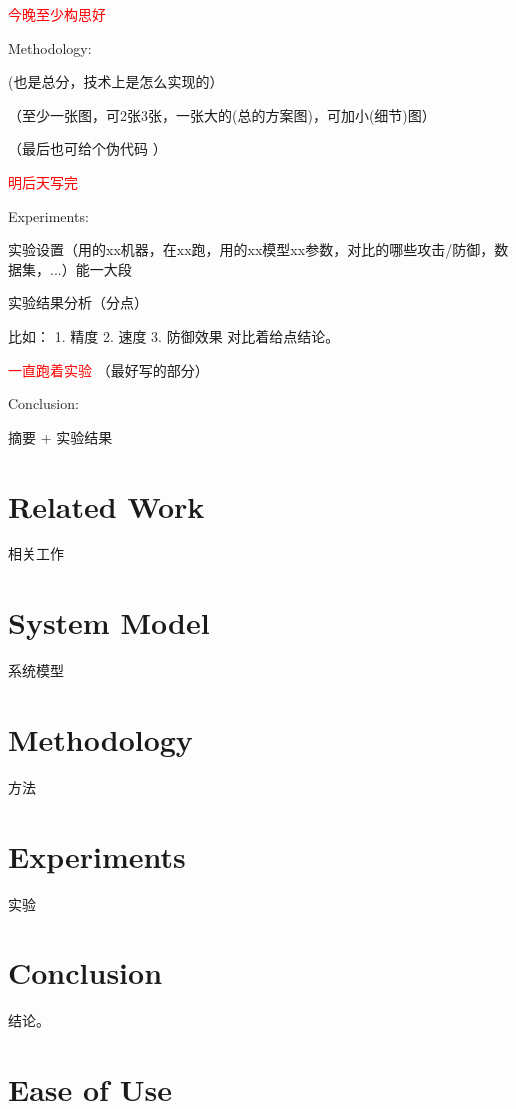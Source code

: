\documentclass[conference]{IEEEtran}
\begin{document}
\textcolor{red}{今晚至少构思好}




Methodology:

(也是总分，技术上是怎么实现的）

（至少一张图，可2张3张，一张大的(总的方案图)，可加小(细节)图）

（最后也可给个伪代码 ）

\textcolor{red}{明后天写完}


Experiments:

实验设置（用的xx机器，在xx跑，用的xx模型xx参数，对比的哪些攻击/防御，数据集，...）能一大段

实验结果分析（分点）

比如：
1. 精度
2. 速度
3. 防御效果
对比着给点结论。

\textcolor{red}{一直跑着实验}
（最好写的部分）


Conclusion:

摘要 + 实验结果


\section{Related Work}
\label{sec:related}

相关工作

\section{System Model}
\label{sec:model}

系统模型

\section{Methodology}
\label{sec:method}

方法

\section{Experiments}
\label{sec:exp}

实验

\section{Conclusion}
\label{sec:conclusion}

结论。


\section{Ease of Use}
\end{document}
